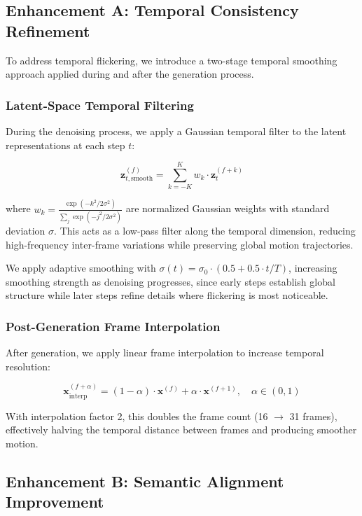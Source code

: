 \documentclass[conference]{IEEEtran}
\begin{document}
\subsection{Enhancement A: Temporal Consistency Refinement}

To address temporal flickering, we introduce a two-stage temporal smoothing approach applied during and after the generation process.

\subsubsection{Latent-Space Temporal Filtering}
During the denoising process, we apply a Gaussian temporal filter to the latent representations at each step $t$:

\begin{equation}
    \mathbf{z}_{t,\text{smooth}}^{(f)} = \sum_{k=-K}^{K} w_k \cdot \mathbf{z}_t^{(f+k)}
\end{equation}

where $w_k = \frac{\exp(-k^2 / 2\sigma^2)}{\sum_{j} \exp(-j^2 / 2\sigma^2)}$ are normalized Gaussian weights with standard deviation $\sigma$. This acts as a low-pass filter along the temporal dimension, reducing high-frequency inter-frame variations while preserving global motion trajectories.

We apply adaptive smoothing with $\sigma(t) = \sigma_0 \cdot (0.5 + 0.5 \cdot t/T)$, increasing smoothing strength as denoising progresses, since early steps establish global structure while later steps refine details where flickering is most noticeable.

\subsubsection{Post-Generation Frame Interpolation}
After generation, we apply linear frame interpolation to increase temporal resolution:

\begin{equation}
    \mathbf{x}_{\text{interp}}^{(f+\alpha)} = (1 - \alpha) \cdot \mathbf{x}^{(f)} + \alpha \cdot \mathbf{x}^{(f+1)}, \quad \alpha \in (0, 1)
\end{equation}

With interpolation factor 2, this doubles the frame count (16 $\to$ 31 frames), effectively halving the temporal distance between frames and producing smoother motion.

\subsection{Enhancement B: Semantic Alignment Improvement}
\end{document}
